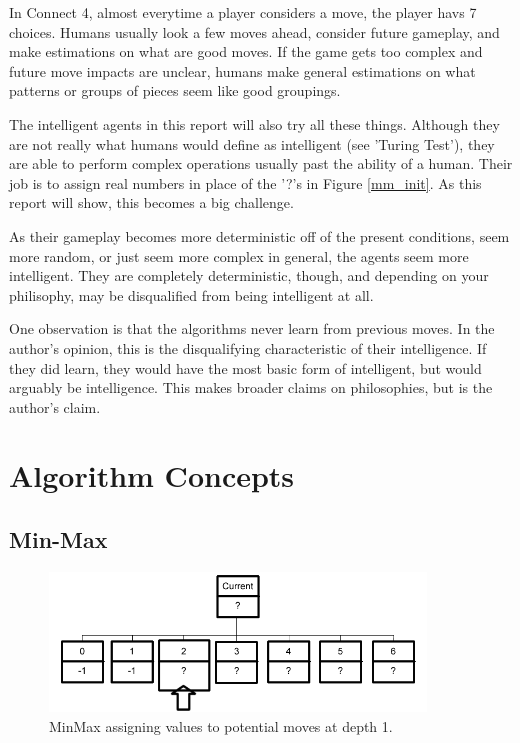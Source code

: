 \documentclass[12pt]{article}
\begin{document}
In Connect 4, almost everytime a player considers a move, the player havs 7 choices. Humans usually look a 
few moves ahead, consider future gameplay, and make estimations on what are good moves. If the game gets
too complex and future move impacts are unclear, humans make general estimations on what patterns or
groups of pieces seem like good groupings.

The intelligent agents in this report will also try all these things. Although they are not really what humans 
would define as intelligent (see 'Turing Test'), they are able to perform complex operations usually past the ability of a human. Their job is to assign real numbers in place of the '?'s in Figure \ref{mm_init}. As this report will show, this becomes a big challenge.

As their gameplay becomes more deterministic off of the present conditions, seem more
random, or just seem more complex in general, the agents seem more intelligent. They are completely 
deterministic, though, and depending on your philisophy, may be disqualified from being intelligent at all.

One observation is that the algorithms never learn from previous moves. In the author's opinion, this is the disqualifying characteristic of their intelligence. If they did learn, they would have the most basic form of 
intelligent, but would arguably be intelligence. This makes broader claims on philosophies, but is the author's
claim.


\section{Algorithm Concepts}

\subsection{Min-Max}

\begin{figure}[h]
        \begin{center}
		\includegraphics[width=100mm]{report_images/mm_top.png}
                	\caption{MinMax assigning values to potential moves at depth 1. }
                	\label{mm_top}
        \end{center}
\end{figure}
\end{document}
